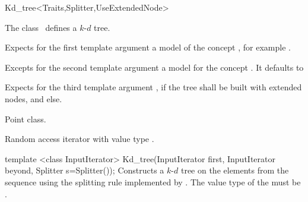

\begin{ccRefClass}{Kd_tree<Traits,Splitter,UseExtendedNode>}  %


\ccDefinition  
The class \ccRefName\ defines a $k$-$d$ tree.


\ccParameters

Expects for the first template argument a model of the concept
, for example .

Excepts for the second template argument a model for the concept .
It defaults  to 

Expects for the third template argument , if the 
tree shall be built with extended nodes, and  else.

\ccTypes

 {Point class.}


\begin{ccAdvanced}
 {Random access iterator 
with value type .}
\end{ccAdvanced}

\ccCreation
{}

\ccConstructor
{template <class InputIterator> Kd_tree(InputIterator first, InputIterator beyond, Splitter s=Splitter());}
{
Constructs a $k$-$d$ tree on the elements from the sequence 
\ccc{[first, beyond)} using the splitting rule implemented by . 
The value type of the  must be .
}


\end{ccRefClass}
